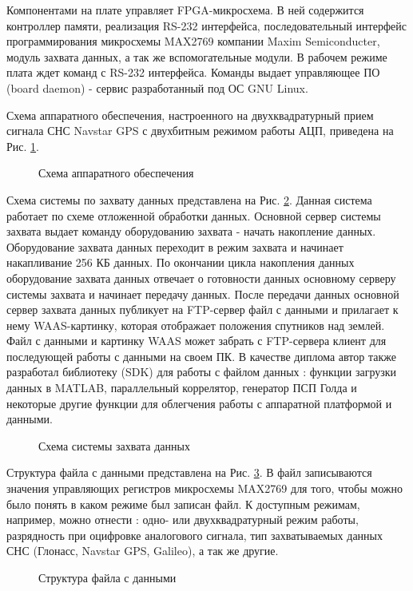 Компонентами на плате управляет FPGA-микросхема. В ней содержится контроллер памяти, реализация RS-232 интерфейса, последовательный интерфейс программирования микросхемы
MAX2769 компании Maxim Semiconducter, модуль захвата данных, а так же вспомогательные модули. В рабочем режиме плата ждет команд с RS-232 интерфейса.
Команды выдает управляющее ПО (board daemon) - сервис разработанный под ОС GNU Linux.

Схема аппаратного обеспечения, настроенного на двухквадратурный прием сигнала СНС Navstar GPS с двухбитным режимом работы АЦП, приведена на Рис. \ref{pic:board_scheme}.
\begin{figure}[h]
	\center{}
	\caption{Схема аппаратного обеспечения}
	\label{pic:board_scheme}
\end{figure}

Схема системы по захвату данных представлена на Рис. \ref{pic:gps_acq_system_scheme}. Данная система работает по схеме отложенной обработки данных. Основной сервер системы захвата
выдает команду оборудованию захвата - начать накопление данных. Оборудование захвата данных переходит в режим захвата и начинает накапливание 256 КБ данных. По окончании цикла
накопления данных оборудование захвата данных отвечает о готовности данных основному серверу системы захвата и начинает передачу данных. После передачи данных основной сервер
захвата данных публикует на FTP-сервер файл с данными и прилагает к нему WAAS-картинку, которая отображает положения спутников над землей. Файл с данными
и картинку WAAS может забрать с FTP-сервера клиент для последующей работы с данными на своем ПК. В качестве диплома автор также разработал библиотеку (SDK) для работы с файлом данных
\cite{github-gpsproject}: функции загрузки данных в MATLAB, параллельный коррелятор, генератор ПСП Голда и некоторые другие функции для облегчения работы с аппаратной платформой
и данными.

\begin{figure}[h]
	\center{}
	\caption{Схема системы захвата данных}
	\label{pic:gps_acq_system_scheme}
\end{figure}

Структура файла с данными представлена на Рис. \ref{pic:dump_file}. В файл записываются значения управляющих регистров микросхемы MAX2769 для того, чтобы можно было
понять в каком режиме был записан файл. К доступным режимам, например, можно отнести \cite{max2769_manual}: одно- или двухквадратурный режим работы, разрядность при оцифровке
аналогового сигнала, тип захватываемых данных СНС (Глонасс, Navstar GPS, Galileo), а так же другие.
\begin{figure}[h]
	\center{}
	\caption{Структура файла с данными}
	\label{pic:dump_file}
\end{figure}

